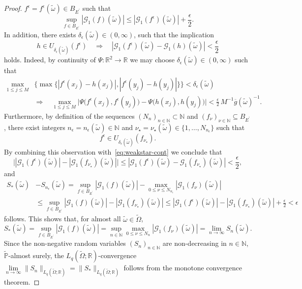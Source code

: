 \documentclass[reqno]{amsart}
\numberwithin{equation}{section}
\newcommand{\bbN}{\mathbb{N}}
\newcommand{\bbP}{\mathbb{P}}
\newcommand{\bbR}{\mathbb{R}}
\newcommand{\cG}{\mathcal{G}}
\newcommand{\Omegat}{\widetilde{\Omega}}
\newcommand{\omegat}{\widetilde{\omega}}
\newcommand{\bbPt}{\widetilde{\bbP}}
\newcommand{\norm}[2]{     \| #1       \|_{ #2 }}
\newcommand{\dual}[1]{{#1}^{\prime}}
\newcommand{\from}{\colon}
\theoremstyle{remark}
\theoremstyle{definition}
\begin{document}
\begin{proof}
	$f^\epsilon = f^\epsilon(\omegat) \in B_{\dual{E}}$ such that 
	\[
		\sup_{f\in B_{\dual{E}\!}} | \cG_1(f)(\omegat) | 
		\leq  
		|\cG_1(f^\epsilon)(\omegat) | 
		+
		\frac{\epsilon}{2}. 
	\]
	In addition, 
	there exists $\delta_\epsilon(\omegat)\in(0,\infty)$, 
	such that the implication 
	\begin{equation}\label{eq:weakstar-cont} 
		h \in U_{\delta_\epsilon(\omegat)} (f^\epsilon)  
		\quad 
		\Longrightarrow 
		\quad 
		| \cG_1(f^\epsilon)(\omegat) - \cG_1(h)(\omegat) | 
		< \frac{\epsilon}{2} 
	\end{equation}
	holds. 
	Indeed, by continuity of $\Psi\from\bbR^2 \to \bbR$ 
	we may choose $\delta_\epsilon(\omegat)\in(0,\infty)$  
	such that 
	\begin{align*} 
		\max_{1\leq j\leq M}  
		&\bigl\{ 
		\max\{ | f^\epsilon(x_j) - h(x_j) |, 
		| f^\epsilon (y_j) - h(y_j) | \} 
		\bigr\} 
		< \delta_\epsilon(\omegat)   
		\\ 
		&\Longrightarrow 
		\quad 
		\max_{1\leq j\leq M} 
		\bigl| \Psi\bigl( f^\epsilon(x_j), f^\epsilon(y_j) \bigr) - \Psi\bigl( h(x_j), h(y_j) \bigr) \bigr| 
		< 
		\frac{\epsilon}{2} \, M^{-1} \overline{g}(\omegat)^{-1}\!. 
	\end{align*} 
	Furthermore, by definition of 
	the sequences 
	$(N_n)_{n\in\bbN}\subset \bbN$ and 
	$(f_\nu)_{\nu\in\bbN}\subseteq B_{\dual{E}}$, 
	there exist integers  
	$n_\epsilon = n_\epsilon(\omegat)\in\bbN$ 
	and 
	$\nu_\star = \nu_\star(\omegat)\in\{1,\ldots,N_{n_\epsilon}\}$ 
	such that 
	\[
		f^\epsilon \in U_{\delta_\epsilon(\omegat)}( f_{\nu_\star} ). 
	\]
	By combining this observation 
	with~\eqref{eq:weakstar-cont} 
	we conclude 
	that 
	\[
		\bigl| | \cG_1(f^\epsilon)(\omegat) | - | \cG_1(f_{\nu_\star})(\omegat) | \bigr| 
		\leq 
		| \cG_1(f^\epsilon)(\omegat) - \cG_1(f_{\nu_\star})(\omegat) | 
		<\frac{\epsilon}{2}, 
	\]
	and   
	\begin{align*} 
		S_{*}(\omegat) 
		&- S_{n_\epsilon} (\omegat) 
		= 
		\sup\limits_{f\in B_{\dual{E}\!}} | \cG_1(f)(\omegat) | 
		- 
		\max\limits_{0\leq \nu\leq N_{n_\epsilon}} | \cG_1(f_\nu)(\omegat) | 
		\\
		&\leq 
		\sup\limits_{f\in B_{\dual{E}\!}} | \cG_1(f)(\omegat) | 
		- 
		| \cG_1(f_{\nu_\star})(\omegat) | 
		\leq 
		| \cG_1(f^\epsilon)(\omegat) | 
		- 
		| \cG_1(f_{\nu_\star})(\omegat) | 
		+
		\frac{\epsilon}{2}
		< 
		\epsilon
	\end{align*} 
	follows. 
	This shows that, for almost all $\omegat\in\Omegat$, 
	\[
		S_*(\omegat)
		= 
		\sup_{f\in B_{\dual{E}\!}} | \cG_1(f)(\omegat) | 
		= 
		\sup_{n\in\bbN}
		\max_{0\leq \nu\leq N_n} | \cG_1(f_\nu) (\omegat)|
		= 
		\lim_{n\to\infty} 
		S_n(\omegat). 
	\]
	Since the 
	non-negative random variables $(S_n)_{n\in\bbN}$ 
	are non-decreasing in $n\in\bbN$, 
	$\bbPt$-almost surely, 
	the $L_q(\Omegat;\bbR)$-convergence 
	$\lim\limits_{n\to\infty}\norm{S_n}{L_q(\Omegat;\bbR)} = \norm{S_*}{L_q(\Omegat;\bbR)}$ 
	follows from the monotone convergence theorem. 
\end{proof} 
\end{document}
